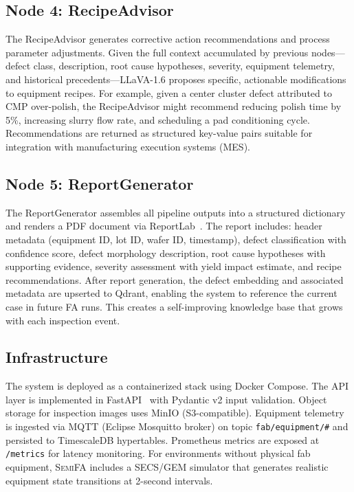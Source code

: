 \documentclass[conference]{IEEEtran}
\newcommand{\semifa}{\textsc{SemiFA}}
\begin{document}
\subsection{Node 4: RecipeAdvisor}

The RecipeAdvisor generates corrective action recommendations and process parameter adjustments.
Given the full context accumulated by previous nodes---defect class, description, root cause hypotheses, severity, equipment telemetry, and historical precedents---LLaVA-1.6 proposes specific, actionable modifications to equipment recipes.
For example, given a center cluster defect attributed to CMP over-polish, the RecipeAdvisor might recommend reducing polish time by 5\%, increasing slurry flow rate, and scheduling a pad conditioning cycle.
Recommendations are returned as structured key-value pairs suitable for integration with manufacturing execution systems (MES).

\subsection{Node 5: ReportGenerator}

The ReportGenerator assembles all pipeline outputs into a structured dictionary and renders a PDF document via ReportLab~\cite{reportlab2024}.
The report includes: header metadata (equipment ID, lot ID, wafer ID, timestamp), defect classification with confidence score, defect morphology description, root cause hypotheses with supporting evidence, severity assessment with yield impact estimate, and recipe recommendations.
After report generation, the defect embedding and associated metadata are upserted to Qdrant, enabling the system to reference the current case in future FA runs.
This creates a self-improving knowledge base that grows with each inspection event.

\subsection{Infrastructure}

The system is deployed as a containerized stack using Docker Compose.
The API layer is implemented in FastAPI~\cite{fastapi2024} with Pydantic v2 input validation.
Object storage for inspection images uses MinIO (S3-compatible).
Equipment telemetry is ingested via MQTT (Eclipse Mosquitto broker) on topic \texttt{fab/equipment/\#} and persisted to TimescaleDB hypertables.
Prometheus metrics are exposed at \texttt{/metrics} for latency monitoring.
For environments without physical fab equipment, \semifa{} includes a SECS/GEM simulator that generates realistic equipment state transitions at 2-second intervals.
\end{document}
